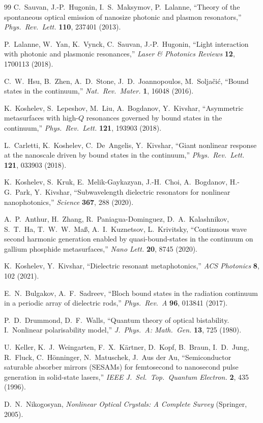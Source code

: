 \documentclass[11pt,a4paper]{article}
\begin{document}
\begin{thebibliography}{99}
C.~Sauvan, J.-P.~Hugonin, I.~S.~Maksymov, P.~Lalanne,
``Theory of the spontaneous optical emission of nanosize photonic and plasmon resonators,''
\emph{Phys.\ Rev.\ Lett.} \textbf{110}, 237401 (2013).

P.~Lalanne, W.~Yan, K.~Vynck, C.~Sauvan, J.-P.~Hugonin,
``Light interaction with photonic and plasmonic resonances,''
\emph{Laser \& Photonics Reviews} \textbf{12}, 1700113 (2018).

C.~W.~Hsu, B.~Zhen, A.~D.~Stone, J.~D.~Joannopoulos, M.~Solja\v{c}i\'c,
``Bound states in the continuum,''
\emph{Nat.\ Rev.\ Mater.} \textbf{1}, 16048 (2016).

K.~Koshelev, S.~Lepeshov, M.~Liu, A.~Bogdanov, Y.~Kivshar,
``Asymmetric metasurfaces with high-$Q$ resonances governed by bound states in the continuum,''
\emph{Phys.\ Rev.\ Lett.} \textbf{121}, 193903 (2018).

L.~Carletti, K.~Koshelev, C.~De~Angelis, Y.~Kivshar,
``Giant nonlinear response at the nanoscale driven by bound states in the continuum,''
\emph{Phys.\ Rev.\ Lett.} \textbf{121}, 033903 (2018).

K.~Koshelev, S.~Kruk, E.~Melik-Gaykazyan, J.-H.~Choi, A.~Bogdanov, H.-G.~Park, Y.~Kivshar,
``Subwavelength dielectric resonators for nonlinear nanophotonics,''
\emph{Science} \textbf{367}, 288 (2020).

A.~P.~Anthur, H.~Zhang, R.~Paniagua-Dominguez, D.~A.~Kalashnikov, S.~T.~Ha,
T.~W.~W.~Ma{\ss}, A.~I.~Kuznetsov, L.~Krivitsky,
``Continuous wave second harmonic generation enabled by quasi-bound-states in the continuum on gallium phosphide metasurfaces,''
\emph{Nano Lett.} \textbf{20}, 8745 (2020).

K.~Koshelev, Y.~Kivshar,
``Dielectric resonant metaphotonics,''
\emph{ACS Photonics} \textbf{8}, 102 (2021).

E.~N.~Bulgakov, A.~F.~Sadreev,
``Bloch bound states in the radiation continuum in a periodic array of dielectric rods,''
\emph{Phys.\ Rev.\ A} \textbf{96}, 013841 (2017).

P.~D.~Drummond, D.~F.~Walls,
``Quantum theory of optical bistability. I.\ Nonlinear polarisability model,''
\emph{J.\ Phys.\ A: Math.\ Gen.} \textbf{13}, 725 (1980).

U.~Keller, K.~J.~Weingarten, F.~X.~K\"artner, D.~Kopf, B.~Braun, I.~D.~Jung, R.~Fluck, C.~H\"onninger, N.~Matuschek, J.~Aus der Au,
``Semiconductor saturable absorber mirrors (SESAMs) for femtosecond to nanosecond pulse generation in solid-state lasers,''
\emph{IEEE J.~Sel.\ Top.\ Quantum Electron.} \textbf{2}, 435 (1996).

D.~N.~Nikogosyan, \emph{Nonlinear Optical Crystals: A Complete Survey} (Springer, 2005).

\end{thebibliography}
\end{document}
